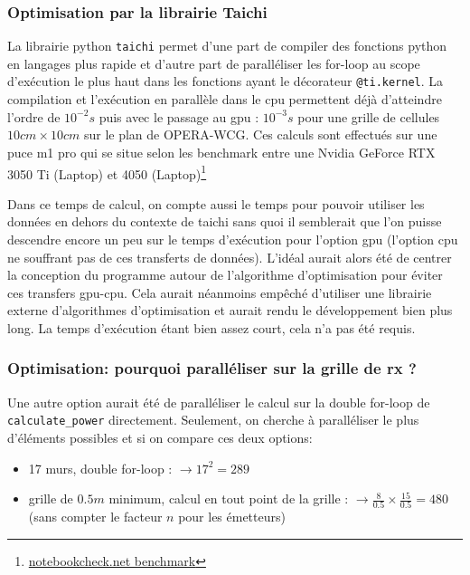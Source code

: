 \documentclass[sn-mathphys-num]{sn-jnl}
\begin{document}
\subsubsection{Optimisation par la librairie Taichi}
La librairie python \texttt{taichi} permet d'une part de compiler des fonctions
python en langages plus rapide et d'autre part de paralléliser
les for-loop au scope d’exécution le plus haut dans les fonctions ayant le décorateur
\texttt{@ti.kernel}. La compilation et l'exécution en parallèle dans le cpu permettent
déjà d'atteindre l'ordre de $10^{-2}s$ puis avec le passage au gpu : $10^{-3}s$ pour une grille
de cellules $10cm\times10cm$ sur le plan de OPERA-WCG. Ces calculs sont effectués sur une
puce m1 pro qui se situe selon les benchmark entre une Nvidia GeForce RTX 3050 Ti (Laptop) et 4050 (Laptop)\footnote{\href{https://www.notebookcheck.net/Apple-M1-Pro-14-Core-GPU-Benchmarks-and-Specs.576651.0.html}{notebookcheck.net benchmark}}

Dans ce temps de calcul, on compte aussi le temps pour pouvoir utiliser les données en dehors du contexte de taichi
sans quoi il semblerait que l'on puisse descendre encore un peu sur le
temps d'exécution pour l'option gpu (l'option cpu ne souffrant pas de ces transferts de données).
L'idéal aurait alors été de centrer la conception du programme autour de l'algorithme d'optimisation
pour éviter ces transfers gpu-cpu. Cela aurait néanmoins empêché d'utiliser une 
librairie externe d'algorithmes d'optimisation et aurait rendu le développement bien plus long.
La temps d'exécution étant bien assez court, cela n'a pas été requis.

\subsubsection{Optimisation: pourquoi paralléliser sur la grille de rx ?}
Une autre option aurait été de paralléliser le calcul sur la double for-loop de \texttt{calculate\_power} directement.
Seulement, on cherche à paralléliser le plus d'éléments possibles et si on compare ces deux options:
\begin{itemize}
    \item 17 murs, double for-loop : $\rightarrow 17^2 = 289$
    \item grille de $0.5m$ minimum, calcul en tout point de la grille : $\rightarrow \frac{8}{0.5} \times \frac{15}{0.5} = 480$
    (sans compter le facteur $n$ pour les émetteurs)
\end{itemize}
\end{document}
